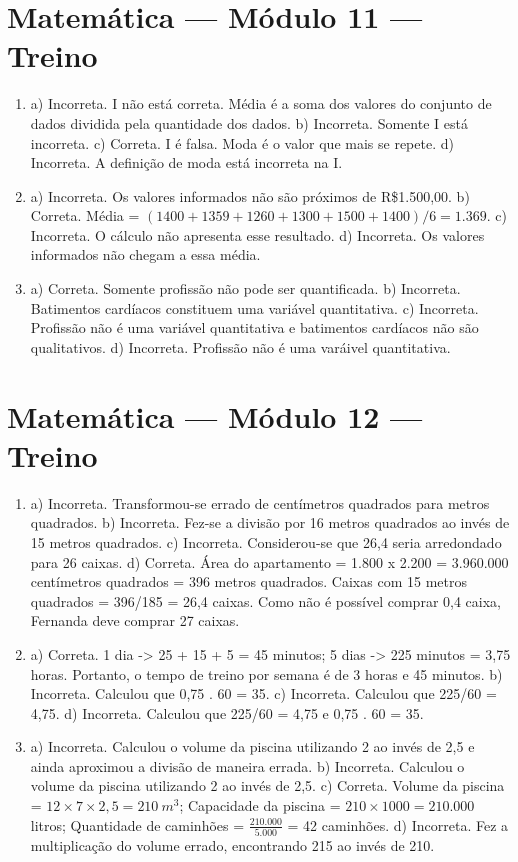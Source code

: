 \section*{Matemática — Módulo 11 — Treino}

\begin{enumerate}
\item a) Incorreta. I não está correta. Média é a soma dos valores
do conjunto de dados dividida pela quantidade dos dados.
b) Incorreta. Somente I está incorreta.
c) Correta. I é falsa. Moda é o valor que mais se repete.
d) Incorreta. A definição de moda está incorreta na I.

\item a) Incorreta. Os valores informados não são próximos de R\$1.500,00.
b) Correta. Média = $(1400 + 1359 + 1260 + 1300 + 1500 + 1400)/6 = 1.369$.
c) Incorreta. O cálculo não apresenta esse resultado.
d) Incorreta. Os valores informados não chegam a essa média.

\item a) Correta. Somente profissão não pode ser quantificada.
b) Incorreta. Batimentos cardíacos constituem uma variável
quantitativa.
c) Incorreta. Profissão não é uma variável quantitativa e 
batimentos cardíacos não são qualitativos.
d) Incorreta. Profissão não é uma varáivel quantitativa.
\end{enumerate}

\section*{Matemática — Módulo 12 — Treino}

\begin{enumerate}
\item a) Incorreta. Transformou-se errado de centímetros quadrados para metros quadrados.
b) Incorreta. Fez-se a divisão por 16 metros quadrados ao invés de 15 metros quadrados.
c) Incorreta. Considerou-se que 26,4 seria arredondado para 26 caixas.
d) Correta. Área do apartamento = 1.800 x 2.200 = 3.960.000 centímetros quadrados = 396 metros quadrados. Caixas com 15 metros quadrados = 396/185 = 26,4 caixas. Como não é possível comprar 0,4 caixa, Fernanda deve comprar 27 caixas.

\item a) Correta. 1 dia -> 25 + 15 + 5 = 45 minutos; 5 dias -> 225 minutos = 3,75 horas.
Portanto, o tempo de treino por semana é de 3 horas e 45 minutos.
b) Incorreta. Calculou que 0,75 . 60 = 35.
c) Incorreta. Calculou que 225/60 = 4,75.
d) Incorreta. Calculou que 225/60 = 4,75 e 0,75 . 60 = 35.

\item a) Incorreta. Calculou o volume da piscina utilizando 2 ao invés
de 2,5 e ainda aproximou a divisão de maneira errada.
b) Incorreta. Calculou o volume da piscina utilizando 2 ao invés
de 2,5.
c) Correta. Volume da piscina = $12 \times 7 \times 2,5 = 210\ m^{3}$; Capacidade da piscina = $210 \times 1000 = 210.000$ litros; Quantidade de caminhões =
$\frac{210.000}{5.000}$ = 42 caminhões.
d) Incorreta. Fez a multiplicação do volume errado, encontrando 215 ao invés de 210.
\end{enumerate}

